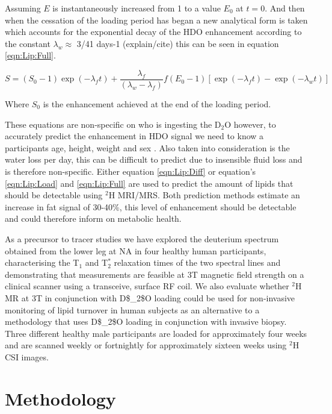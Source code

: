 Assuming $E$ is instantaneously increased from 1 to a value $E_0$ at $t=0$. And then when the cessation of the loading period has began a new analytical form is taken which accounts for the exponential decay of the HDO enhancement according to the constant $\lambda_w \approx$ 3/41 days-1 (explain/cite) this can be seen in equation \ref{eqn:Lip:Full}.

\begin{equation}
    S = (S_0 - 1)\exp(-\lambda_ft)+\frac{\lambda_f}{(\lambda_w - \lambda_f)}f(E_0 - 1)[\exp(-\lambda_ft)-\exp(-\lambda_wt)]
    \label{eqn:Lip:Full}
\end{equation}

Where $S_0$ is the enhancement achieved at the end of the loading period.

These equations are non-specific on who is ingesting the D$_2$O however, to accurately predict the enhancement in \ac{HDO} signal we need to know a participants age, height, weight and sex \cite{Watson1980TotalMeasurements}. Also taken into consideration is the water loss per day, this can be difficult to predict due to insensible fluid loss and is therefore non-specific. Either equation \ref{eqn:Lip:Diff} or equation’s \ref{eqn:Lip:Load} and \ref{eqn:Lip:Full} are used to predict the amount of lipids that should be detectable using $^2$H \ac{MRI}/\ac{MRS}. Both prediction methods estimate an increase in fat signal of 30-40\%, this level of enhancement should be detectable and could therefore inform on metabolic health. 

As a precursor to tracer studies we have explored the deuterium spectrum obtained from the lower leg at \ac{NA} in four healthy human participants, characterising the T$_1$ and T$_2^*$ relaxation times of the two spectral lines and demonstrating that measurements are feasible at 3T magnetic field strength on a clinical scanner using a transceive, surface \ac{RF} coil. We also evaluate whether $^2$H MR at 3T in conjunction with \ac{D$_2$O} loading could be used for non-invasive monitoring of lipid turnover in human subjects as an alternative to a methodology that uses \ac{D$_2$O} loading in conjunction with invasive biopsy. Three different healthy male participants are loaded for approximately four weeks and are scanned weekly or fortnightly for approximately sixteen weeks using $^2$H \ac{CSI} images.

\section{Methodology}


